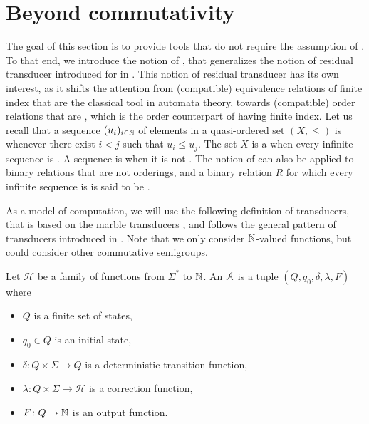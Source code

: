 \section{Beyond commutativity}
\label{beyond-commutative:sec}

\AP The goal of this section is to provide tools that do not require the
assumption of . To that end, we introduce the notion of
, that generalizes the notion of residual
transducer introduced for  in \cite{LOPEZ23b}.
This notion of residual transducer has its own interest, as it shifts the
attention from (compatible) equivalence relations of finite index that are the
classical tool in automata theory, towards (compatible) order relations that
are , which is the order counterpart of having finite
index. Let us recall that a sequence $(u_i)_{i \in \mathbb{N}}$ of elements in a
quasi-ordered set $(X, \leq)$ is  whenever there exist $i < j$ such
that $u_i \leq u_j$. The set $X$ is a  when every
infinite sequence is . A sequence is  when it is not
. The notion of  can also be applied to
binary relations that are not orderings, and a binary relation $R$ for which
every infinite sequence is  is said to be 
\cite{MELL98}.

As a model of computation, we will use the following definition of transducers,
that is based on the marble transducers \cite{EHB99}, and follows the general
pattern of transducers introduced in \cite{LOPEZ23b}. Note that we only
consider $\mathbb{N}$-valued functions, but could consider other commutative
semigroups.

\begin{definition}
    Let $\mathcal{H}$ be a family of functions
    from $\Sigma^*$ to $\mathbb{N}$.
    An  $\mathcal{A}$ is
    a tuple $(Q, q_0, \delta, \lambda, F)$ where
    \begin{itemize}
        \item $Q$ is a finite set of states,
        \item $q_0 \in Q$ is an initial state,
        \item $\delta \colon Q \times \Sigma \to Q$
            is a deterministic transition function,
        \item $\lambda \colon Q \times \Sigma \to \mathcal{H}$
            is a correction function,
        \item $F \colon Q \to \mathbb{N}$ is an output function.
    \end{itemize}
\end{definition}

